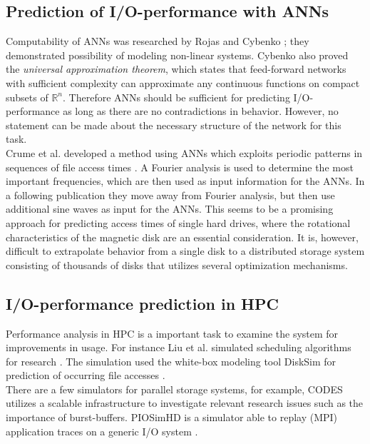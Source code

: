 \documentclass{superfri}
\begin{document}
\subsection{Prediction of I/O-performance with ANNs}
Computability of ANNs was researched by Rojas \cite{Rojas:1996:NNS:235222} and Cybenko \cite{cybenko:mcss}; they demonstrated possibility of modeling non-linear systems. 
Cybenko also proved the \textit{universal approximation theorem}, which states that feed-forward networks with sufficient complexity can approximate any continuous functions on compact subsets of $\mathbb{R}^n$.
Therefore ANNs should be sufficient for predicting I/O-performance as long as there are no contradictions in behavior. 
However, no statement can be made about the necessary structure of the network for this task.\\
Crume et al. developed a method using ANNs which exploits periodic patterns in sequences of file access times \cite{Crume:2013:FML:2538542.2538561}.
A Fourier analysis is used to determine the most important frequencies, which are then used as input information for the ANNs.
In a following publication \cite{crumelatent} they move away from Fourier analysis, but then use additional sine waves as input for the ANNs.
This seems to be a promising approach for predicting access times of single hard drives, where the rotational characteristics of the magnetic disk are an essential consideration. 
It is, however, difficult to extrapolate behavior from a single disk to a distributed storage system consisting of thousands of disks that utilizes several optimization mechanisms.

\subsection{I/O-performance prediction in HPC}
Performance analysis in HPC is a important task to examine the system for improvements in usage.
For instance Liu et al. simulated scheduling algorithms for research \cite{liu2011towards}. 
The simulation used the white-box modeling tool DiskSim for prediction of occurring file accesses \cite{Bucy08thedisksim}.\\
There are a few simulators for parallel storage systems, for example, CODES\,\cite{cope2011codes} utilizes a scalable infrastructure to investigate relevant research issues such as the importance of burst-buffers.
PIOSimHD is a simulator able to replay (MPI) application traces on a generic I/O system \cite{kunkel2013simulating}.
\end{document}
